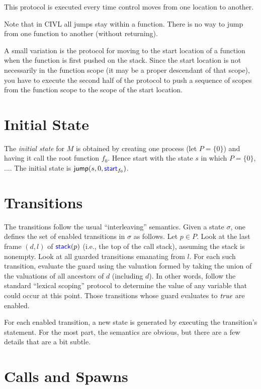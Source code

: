 \documentclass[11pt, oneside, letterpaper]{book}
\begin{document}
This protocol is executed every time control moves from one location
to another.

Note that in CIVL all jumps stay within a function.  There is no
way to jump from one function to another (without returning).

A small variation is the protocol for moving to the start location of
a function when the function is first pushed on the stack. Since the
start location is not necessarily in the function scope (it may be a
proper descendant of that scope), you have to execute the second half
of the protocol to push a sequence of scopes from the function scope
to the scope of the start location.

\section{Initial State}

The \emph{initial state} for $M$ is obtained by creating one process
(let $P=\{0\}$) and having it call the root function $f_0$. 
Hence start with the state $s$ in which $P=\{0\}$, $\ldots$.
The initial state is $\textsf{jump}(s,0,\textsf{\textcolor{blue}{\textup{start}}}_{f_0})$.

\section{Transitions}

The transitions follow the usual ``interleaving'' semantics. Given a
state $\sigma$, one defines the set of enabled transitions in $\sigma$
as follows. Let $p\in P$. Look at the last frame $(d,l)$ of
$\textsf{\textcolor{blue}{\textup{stack}}}(p)$ (i.e., the top of the call stack), assuming the stack is
nonempty. Look at all guarded transitions emanating from $l$. For each
such transition, evaluate the guard using the valuation formed by
taking the union of the valuations of all ancestors of $d$ (including
$d$). In other words, follow the standard ``lexical scoping'' protocol
to determine the value of any variable that could occur at this point.
Those transitions whose guard evaluates to $\emph{true}$ are enabled.

For each enabled transition, a new state is generated by executing
the transition's statement.  For the most part, the semantics are obvious,
but there are a few details that are a bit subtle.

\section{Calls and Spawns}
\end{document}
